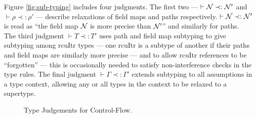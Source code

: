 Figure \ref{fig:sub-typing} includes four judgments.  The first two --- $\vdash\mathcal{N}\prec:\mathcal{N}'$ and $\vdash\rho\prec:\rho'$ --- describe relaxations of field maps and paths respectively.  $\vdash\mathcal{N}\prec:\mathcal{N}'$ is read as ``the field map $\mathcal{N}$ is more precise than $\mathcal{N}'$'' and similarly for paths.
The third judgment $\vdash T\prec:T'$ uses path and field map subtyping to give subtyping among \textsf{rcuItr} types --- one \textsf{rcuItr} is a subtype of another if their paths and field maps are similarly more precise --- and to allow \textsf{rcuItr} references to be ``forgotten'' --- this is occasionally needed to satisfy non-interference checks in the type rules.
The final judgment $\vdash\Gamma\prec:\Gamma'$ extends subtyping to all assumptions in a type context, allowing any or all types in the context to be relaxed to a supertype.
\begin{figure}[!t]\scriptsize
{}
\vspace{-2em}
\caption{Type Judgements for Control-Flow.}
\label{fig:type-judgements-for-cf}
\end{figure}

